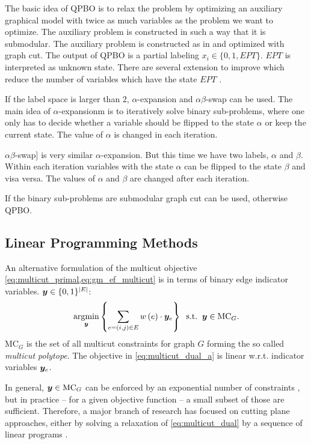 The basic idea of QPBO is to relax the problem by optimizing an auxiliary graphical
model with twice as much variables as the problem we want to optimize. The
auxiliary problem is constructed in such a way that it is submodular. The
auxiliary problem is constructed as in \cite{rother_2007_cvpr} and optimized with graph cut. 
The output of QPBO
is a partial labeling $x_i \in \{ 0,1, EPT \}$. $EPT$ is interpreted as unknown state. There are several
extension to improve which reduce the number
of variables which have the state $EPT$ .


If the label space is larger than 2, $\alpha$-expansion and $\alpha \beta$-swap \cite{boykov_2001_pami} can be used.
The main idea of $\alpha$-expansionm is to iteratively
solve binary sub-problems, where one only has to decide whether a variable should be
flipped to the state $\alpha$ or keep the current state. The value of $\alpha$ is changed in each iteration.

$\alpha \beta$-swap] is very similar  $\alpha$-expansion.
But this time we have two labels, $\alpha$ and $\beta$. Within each iteration variables
with the state $\alpha$ can be flipped to the state $\beta$ and visa versa. The values of $\alpha$ and $\beta$
are changed after each iteration.

If the binary sub-problems are submodular graph cut can be used, otherwise QPBO.



\subsection{Linear Programming Methods}



An alternative formulation of the multicut objective \cref{eq:multicut_primal,eq:gm_ef_multicut} 
is in terms of binary edge indicator variables.
$\boldsymbol y \in \{0,1\}^{| E |}$:
\begin{align}
\argmin_{\y}
%
\left\{
    \sum_{e=(i,j) \in E} \w \left(e\right) \cdot \y_{e}
\right\}%
%
\;\;\text{s.t.}\;\;\y \in \MC_G.
\label{eq:multicut_dual_a}
\end{align}
%
%
$\text{MC}_G$ is the set of all multicut
constraints \cite{chopra_1993_mp} for graph $G$ forming
the so called \emph{multicut polytope}.
The objective in \cref{eq:multicut_dual_a}
is linear w.r.t. indicator variables $\boldsymbol y_{e}$.

In general,
$\boldsymbol y \in \text{MC}_G$ can be enforced by an exponential number of
constraints \cite{chopra_1993_mp}, but in practice
-- for a given objective function --
a small subset of those are sufficient.
Therefore, a major branch of research has focused 
on cutting plane approaches,
either by solving a relaxation of \eqref{eq:multicut_dual}
by a sequence of linear programs 
\cite{kim_2011_nips,kim_2012_ip,kappes_2013_arxiv,finley_2005_ml}.














